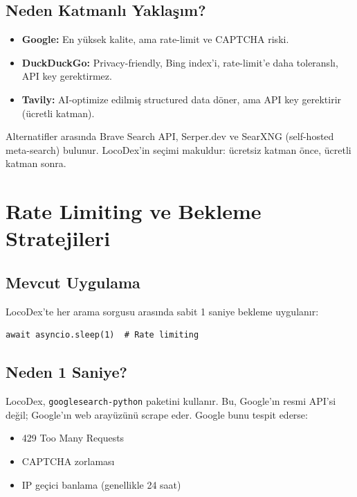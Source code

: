 \subsection{Neden Katmanl{\i} Yakla\c{s}{\i}m?}

\begin{itemize}
  \item \textbf{Google:} En y\"{u}ksek kalite, ama rate-limit ve CAPTCHA riski.
  \item \textbf{DuckDuckGo:} Privacy-friendly, Bing index'i, rate-limit'e daha toleransl{\i}, API key gerektirmez.
  \item \textbf{Tavily:} AI-optimize edilmi\c{s} structured data d\"{o}ner, ama API key gerektirir (\"{u}cretli katman).
\end{itemize}

\noindent
Alternatifler aras{\i}nda Brave Search API, Serper.dev ve SearXNG (self-hosted meta-search) bulunur. LocoDex'in se\c{c}imi makuldur: \"{u}cretsiz katman \"{o}nce, \"{u}cretli katman sonra.


\section{Rate Limiting ve Bekleme Stratejileri}
\label{sec:search-rate-limiting}

\subsection{Mevcut Uygulama}

LocoDex'te her arama sorgusu aras{\i}nda sabit 1 saniye bekleme uygulan{\i}r:

\begin{lstlisting}[caption={Rate limiting uygulamas{\i} (real\_deep\_research.py)}, label={lst:rate-limit}]
await asyncio.sleep(1)  # Rate limiting
\end{lstlisting}

\subsection{Neden 1 Saniye?}

LocoDex, \texttt{googlesearch-python} paketini kullan{\i}r. Bu, Google'{\i}n resmi API'si de\u{g}il; Google'{\i}n web aray\"{u}z\"{u}n\"{u} scrape eder. Google bunu tespit ederse:
\begin{itemize}
  \item 429 Too Many Requests
  \item CAPTCHA zorlamas{\i}
  \item IP ge\c{c}ici banlama (genellikle 24 saat)
\end{itemize}


